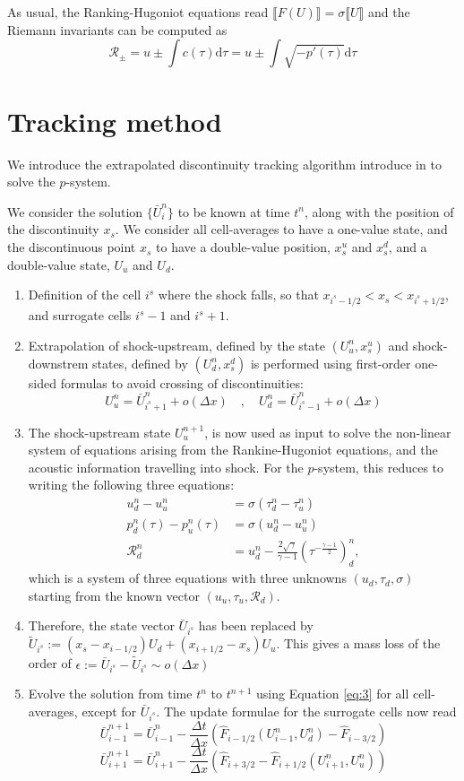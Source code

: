 \documentclass[10pt]{article}
\begin{document}
As usual, the Ranking-Hugoniot equations read $\llbracket F(U) \rrbracket = \sigma \llbracket U \rrbracket$
and the Riemann invariants can be computed as 
$$ \mathcal{R}_\pm = u \pm \int c(\tau) \text{d}\tau = u \pm \int \sqrt{-p'(\tau)}\text{d}\tau $$

\section{Tracking method}

We introduce the extrapolated discontinuity tracking algorithm introduce in \cite{} 
to solve the $p$-system.  

We consider the solution $\{\bar U^n_i\}$ to be known at time $t^n$, along with the position of the 
discontinuity $x_s$. We consider all cell-averages to have a one-value state, and the discontinuous point $x_s$
to have a double-value position, $x_s^u$ and $x_s^d$, and a double-value state, $U_u$ and $U_d$.  

\begin{enumerate}
\item Definition of the cell $i^s$ where the shock falls, so that $x_{i^s-1/2}<x_s<x_{i^s+1/2}$, and surrogate cells $i^s-1$ and $i^s+1$.
\item Extrapolation of shock-upstream, defined by the state $(U^n_u, x_s^u)$ and shock-downstrem states, defined by $(U^n_d, x_s^d)$ 
is performed using first-order one-sided formulas to avoid crossing of discontinuities:
$$  U^n_u = \bar U^n_{i^s+1} + o(\Delta x) \quad , \quad U^n_d = \bar U^n_{i^s-1} + o(\Delta x) $$ 
\item The shock-upstream state $U^{n+1}_u$, is now used as input to solve the non-linear system of equations arising from the 
Rankine-Hugoniot equations, and the acoustic information travelling into shock. For the $p$-system, this reduces to writing  
the following three equations:
\begin{align*}
u^n_d - u^n_u &= \sigma (\tau^n_d - \tau^n_u) \\
p^n_d(\tau) - p^n_u(\tau) &= \sigma (u^n_d - u^n_u) \\
\mathcal{R}^n_d &= u^n_d - \frac{2\sqrt{\gamma}}{\gamma-1}(\tau^{-\frac{\gamma-1}{2}})^n_d, 
\end{align*}
which is a system of three equations with three unknowns $(u_d,\tau_d,\sigma)$ starting from the known vector $(u_u,\tau_u,\mathcal{R}_d)$.
\item Therefore, the state vector $\bar U_{i^s}$ has been replaced by $\tilde U_{i^s}:=(x_s - x_{i-1/2})U_d + (x_{i+1/2}-x_s)U_u$. This gives a mass loss of the order of
$\epsilon:=\bar U_{i^s}-\tilde U_{i^s}\sim o(\Delta x)$
\item Evolve the solution from time $t^n$ to $t^{n+1}$ using Equation \eqref{eq:3} for all cell-averages, except for $\bar U_{i^s}$.
The update formulae for the surrogate cells now read 
$$ \bar U^{n+1}_{i-1} = \bar U^{n}_{i-1} - \dfrac{\Delta t}{\Delta x}\left(\hat F_{i-1/2}(U^n_{i-1},U^n_d)  -  \hat F_{i-3/2}\right) $$
$$ \bar U^{n+1}_{i+1} = \bar U^{n}_{i+1} - \dfrac{\Delta t}{\Delta x}\left(\hat F_{i+3/2}  -  \hat F_{i+1/2}(U^n_{i+1},U^n_u)\right) $$
\end{enumerate}
\end{document}
